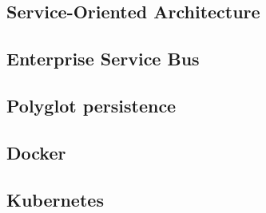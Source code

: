 \subsection{Service-Oriented Architecture}
\label{sec:SOA_architectuur}



\subsection{Enterprise Service Bus}
\label{sec:ESB}

\subsection{Polyglot persistence}
\label{sec:Polyglot Persistence}

\subsection{Docker}

\subsection{Kubernetes}





